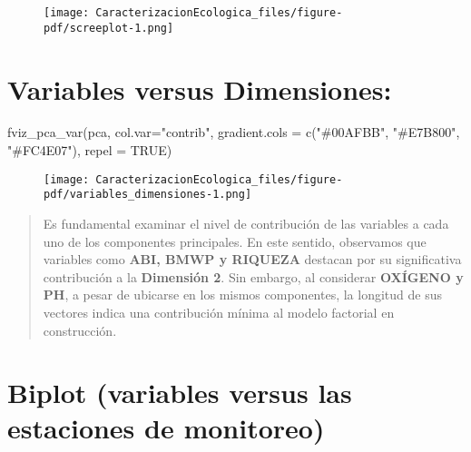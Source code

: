 \documentclass[
  10pt,
  letterpaper,
  DIV=11,
  numbers=noendperiod]{scrreprt}
\newenvironment{Shaded}{\begin{snugshade}}{\end{snugshade}}
\newcommand{\AttributeTok}[1]{\textcolor[rgb]{0.40,0.45,0.13}{#1}}
\newcommand{\ConstantTok}[1]{\textcolor[rgb]{0.56,0.35,0.01}{#1}}
\newcommand{\FunctionTok}[1]{\textcolor[rgb]{0.28,0.35,0.67}{#1}}
\newcommand{\NormalTok}[1]{\textcolor[rgb]{0.00,0.23,0.31}{#1}}
\newcommand{\StringTok}[1]{\textcolor[rgb]{0.13,0.47,0.30}{#1}}
\begin{document}
\begin{figure}[tb]

{\centering \texttt{[image: CaracterizacionEcologica\_files/figure-pdf/screeplot-1.png]}

}

\end{figure}

\hypertarget{variables-versus-dimensiones}{%
\section{Variables versus
Dimensiones:}\label{variables-versus-dimensiones}}

\begin{Shaded}
\begin{Highlighting}[numbers=left,,]
\FunctionTok{fviz\_pca\_var}\NormalTok{(pca,}
             \AttributeTok{col.var=}\StringTok{"contrib"}\NormalTok{,}
             \AttributeTok{gradient.cols =} \FunctionTok{c}\NormalTok{(}\StringTok{"\#00AFBB"}\NormalTok{, }\StringTok{"\#E7B800"}\NormalTok{, }\StringTok{"\#FC4E07"}\NormalTok{),}
             \AttributeTok{repel =} \ConstantTok{TRUE}\NormalTok{)}
\end{Highlighting}
\end{Shaded}

\begin{figure}[tb]

{\centering \texttt{[image: CaracterizacionEcologica\_files/figure-pdf/variables\_dimensiones-1.png]}

}

\end{figure}

\begin{quote}
Es fundamental examinar el nivel de contribución de las variables a cada
uno de los componentes principales. En este sentido, observamos que
variables como \textbf{ABI, BMWP y RIQUEZA} destacan por su
significativa contribución a la \textbf{Dimensión 2}. Sin embargo, al
considerar \textbf{OXÍGENO y PH}, a pesar de ubicarse en los mismos
componentes, la longitud de sus vectores indica una contribución mínima
al modelo factorial en construcción.
\end{quote}

\hypertarget{biplot-variables-versus-las-estaciones-de-monitoreo}{%
\section{Biplot (variables versus las estaciones de
monitoreo)}\label{biplot-variables-versus-las-estaciones-de-monitoreo}}
\end{document}
